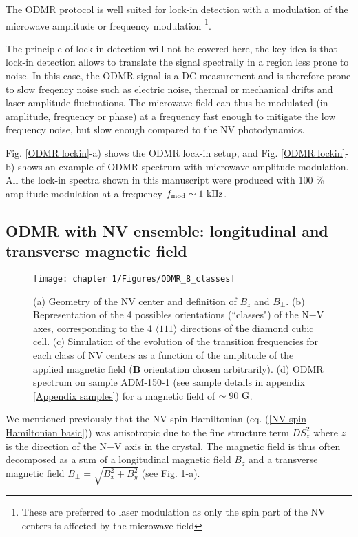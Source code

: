 \documentclass[a4paper, 11pt]{report}
\begin{document}
The ODMR protocol is well suited for lock-in detection with a modulation of the microwave amplitude or frequency modulation \footnote{These are preferred to laser modulation as only the spin part of the NV centers is affected by the microwave field}.

The principle of lock-in detection will not be covered here, the key idea is that lock-in detection allows to translate the signal spectrally in a region less prone to noise. In this case, the ODMR signal is a DC measurement and is therefore prone to slow freqency noise such as electric noise, thermal or mechanical drifts and laser amplitude fluctuations. The microwave field can thus be modulated (in amplitude, frequency or phase) at a frequency fast enough to mitigate the low frequency noise, but slow enough compared to the NV photodynamics. 

Fig. \ref{ODMR lockin}-a) shows the ODMR lock-in setup, and Fig. \ref{ODMR lockin}-b) shows an example of ODMR spectrum with microwave amplitude modulation. All the lock-in spectra shown in this manuscript were produced with 100 \% amplitude modulation at a frequency $f_{\rm mod} \sim 1\ \rm kHz$.

\subsection{ODMR with NV ensemble: longitudinal and transverse magnetic field}
\label{sec champs transverse}
\begin{figure}[h!]
\centering
\texttt{[image: chapter 1/Figures/ODMR\_8\_classes]}
\caption{(a) Geometry of the NV center and definition of $B_z$ and $B_\perp$. (b) Representation of the 4 possibles orientations (``classes") of the N$-$V axes, corresponding to the 4 $\langle 111 \rangle$ directions of the diamond cubic cell. (c) Simulation of the evolution of the transition frequencies for each class of NV centers as a function of the amplitude of the applied magnetic field ($\textbf{B}$ orientation chosen arbitrarily). (d) ODMR spectrum on sample ADM-150-1 (see sample details in appendix \ref{Appendix samples}) for a magnetic field of $\sim 90\ \rm G$.}
\label{ODMR 8 classes}
\end{figure}

We mentioned previously that the NV spin Hamiltonian (eq. (\ref{NV spin Hamiltonian basic})) was anisotropic due to the fine structure term $D S_z^2$ where $z$ is the direction of the N$-$V axis in the crystal. The magnetic field is thus often decomposed as a sum of a longitudinal magnetic field $B_z$ and a transverse magnetic field $B_\perp=\sqrt{B_x^2+B_y^2}$ (see Fig. \ref{ODMR 8 classes}-a). 
\end{document}
